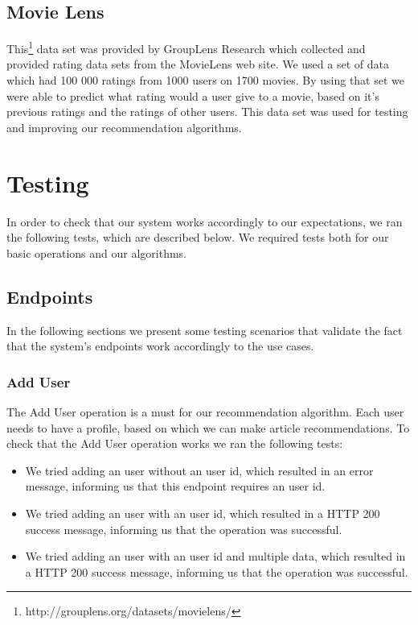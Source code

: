 \subsection{Movie Lens} 
\label{sec:testing-and-validation-data-sources-movie-lens}
This\footnote{http://grouplens.org/datasets/movielens/} data set was provided by GroupLens Research which collected and provided rating data sets from the MovieLens web site. We used a set of data which had  100 000 ratings from 1000 users on 1700 movies.
By using that set we were able to predict what rating would a user give to a movie, based on it's previous ratings and the ratings of other users. This data set was used for testing and improving our recommendation algorithms.

\section{Testing} 
\label{sec:testing-and-validation-testing}
In order to check that our system works accordingly to our expectations, we ran the following tests, which are described below.
We required tests both for our basic operations and our algorithms.

\subsection{Endpoints} 
\label{sec:basic-operations}
In the following sections we present some testing scenarios that validate the fact that the system's endpoints work accordingly to the use cases.

\subsubsection{Add User}
\label{sec:basic-operations-add-user}
The Add User operation is a must for our recommendation algorithm. Each user needs to have  a profile, based on which we can make article recommendations. To check that the Add User operation works we ran the following tests: 
\begin{itemize}
	\item We tried adding an user without an user id, which resulted in an error message, informing us that this endpoint requires an user id.
	\item We tried adding an user with an user id, which resulted in a HTTP 200 success message, informing us that the operation was successful.
	\item We tried adding an user with an user id and multiple data, which resulted in a HTTP 200 success message, informing us that the operation was successful.
\end{itemize}


